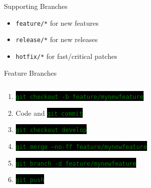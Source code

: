 \documentclass[
14pt,
aspectratio=169,
usenames,
dvipsnames,
x11names]{beamer}
\newcommand{\code}[1]{{\small\colorbox{black}{\textcolor{green}{\texttt{#1}}}}}
\begin{document}
\begin{frame}{Supporting Branches}
  \begin{itemize} \setlength{\itemsep}{\fill}
  \item \alert{\texttt{feature/*}} for new features
  \item \alert{\texttt{release/*}} for new releases
  \item \alert{\texttt{hotfix/*}} for fast/critical patches
  \end{itemize}
\end{frame}

\begin{frame}{Feature Branches}
  \begin{columns}
    \begin{column}{.65\linewidth}
      \minipage[c][0.75\textheight][s]{\columnwidth}
      \begin{enumerate} \setlength{\itemsep}{\fill}
      \item \code{git checkout -b feature/mynewfeature}
      \item Code and \code{git commit}
      \item \code{git checkout develop}
      \item \code{git merge --no-ff feature/mynewfeature}
      \item \code{git branch -d feature/mynewfeature}
      \item \code{git push}
      \end{enumerate}
      \endminipage
    \end{column}
    \begin{column}{.35\linewidth}
      \centering

\end{column}
\end{columns}
\end{frame}
\end{document}
